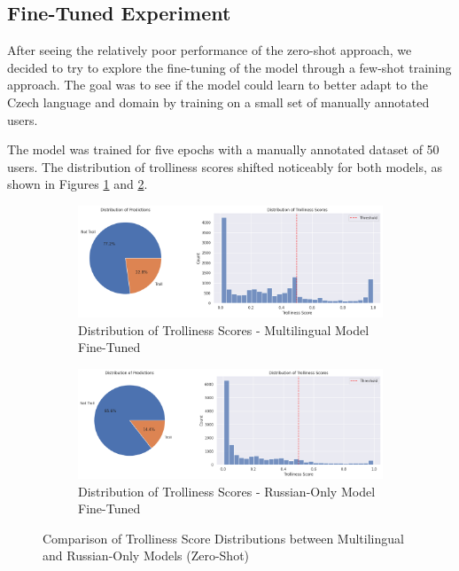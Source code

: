 \documentclass[twoside]{ctuthesis}
\theoremstyle{plain}
\theoremstyle{definition}
\theoremstyle{note}
\begin{document}
\subsection{Fine-Tuned Experiment}
After seeing the relatively poor performance of the zero-shot approach, we decided to try to explore the fine-tuning of the model through a few-shot training approach. The goal was to see if the model could learn to better adapt to the Czech language and domain by training on a small set of manually annotated users.\par
The model was trained for five epochs with a manually annotated dataset of 50 users. The distribution of trolliness scores shifted noticeably for both models, as shown in Figures \ref{fig:distribution_multi_finetuned} and \ref{fig:russian_distribution_finetuned}.\par

\begin{figure}[H]
  \centering
  \begin{subfigure}{0.8\linewidth}
    \centering
    \includegraphics[width=\linewidth]{figures/distribution_fine_tuned.png}
    \caption{Distribution of Trolliness Scores - Multilingual Model Fine-Tuned}
    \label{fig:distribution_multi_finetuned}
  \end{subfigure}

  \vspace{1em}
  \begin{subfigure}{0.8\linewidth}
    \centering
    \includegraphics[width=\linewidth]{figures/distribution_ru_finetuned0.png}
    \caption{Distribution of Trolliness Scores - Russian-Only Model Fine-Tuned}
    \label{fig:russian_distribution_finetuned}
  \end{subfigure}

  \caption{Comparison of Trolliness Score Distributions between Multilingual and Russian-Only Models (Zero-Shot)}
  \label{fig:distribution_comparison_finetuned}
\end{figure}
\end{document}
